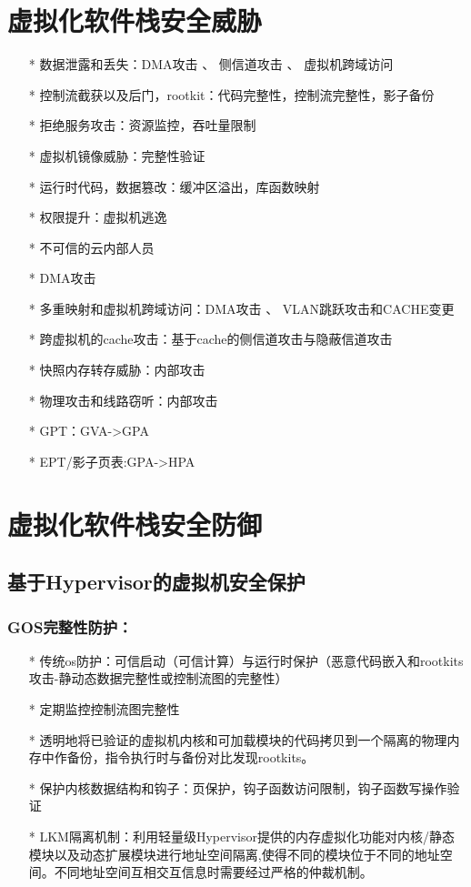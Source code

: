 \documentclass[UTF8]{ctexart}
\begin{document}
	\section{虚拟化软件栈安全威胁}\label{sec:disijie}
	\begin{itemize}
	\item[*] 数据泄露和丢失：DMA攻击 、 侧信道攻击 、 虚拟机跨域访问
	\item[*] 控制流截获以及后门，rootkit：代码完整性，控制流完整性，影子备份
	\item[*] 拒绝服务攻击：资源监控，吞吐量限制
	\item[*] 虚拟机镜像威胁：完整性验证
	\item[*] 运行时代码，数据篡改：缓冲区溢出，库函数映射
	\item[*] 权限提升：虚拟机逃逸
	\item[*] 不可信的云内部人员

	\item[*] DMA攻击
	\item[*] 多重映射和虚拟机跨域访问：DMA攻击 、 VLAN跳跃攻击和CACHE变更
	\item[*] 跨虚拟机的cache攻击：基于cache的侧信道攻击与隐蔽信道攻击
	\item[*] 快照内存转存威胁：内部攻击
	\item[*] 物理攻击和线路窃听：内部攻击

	\item[*] GPT：GVA->GPA
	\item[*] EPT/影子页表:GPA->HPA

	\end{itemize}
	\clearpage
	    
	\section{虚拟化软件栈安全防御}\label{sec:diwujie}
	\subsection{基于Hypervisor的虚拟机安全保护}
	\subsubsection{GOS完整性防护：} 
	\begin{itemize}
	\item[*] 传统os防护：可信启动（可信计算）与运行时保护（恶意代码嵌入和rootkits攻击-静动态数据完整性或控制流图的完整性）
	\item[*] 定期监控控制流图完整性
	\item[*] 透明地将已验证的虚拟机内核和可加载模块的代码拷贝到一个隔离的物理内存中作备份，指令执行时与备份对比发现rootkits。
	\item[*] 保护内核数据结构和钩子：页保护，钩子函数访问限制，钩子函数写操作验证
	\item[*] LKM隔离机制：利用轻量级Hypervisor提供的内存虚拟化功能对内核/静态模块以及动态扩展模块进行地址空间隔离,使得不同的模块位于不同的地址空间。不同地址空间互相交互信息时需要经过严格的仲裁机制。
	\end{itemize}
\end{document}
